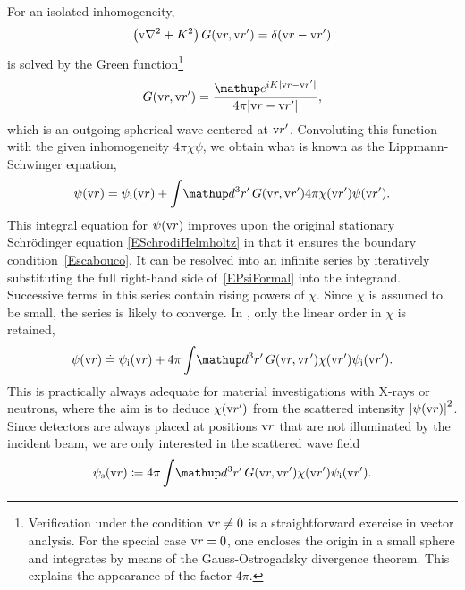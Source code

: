 For an isolated inhomogeneity,
\begin{equation}\label{EHelmholtzForGreen}
  \left(\text{v}{\nabla}^2+K^2\right)G(\text{v}{r},\text{v}{r}') = \delta(\text{v}{r}-\text{v}{r}')
\end{equation}
%
%
is solved by the Green function\footnote
{Verification under the condition $\text{v}{r}\ne0$
is a straightforward exercise in vector analysis.
For the special case $\text{v}{r}=0$,
one encloses the origin in a small sphere
and integrates by means of the Gauss-Ostrogadsky divergence theorem.
This explains the appearance of the factor $4\pi$.}
\begin{equation}\label{EGreens1}
  G(\r,\r') = \frac{\e^{iK|\r-\r'|}}{4\pi |\r-\r'|},
\end{equation}
which is an outgoing spherical wave centered at $\text{v}{r}'$.
Convoluting this function with the given inhomogeneity $4\pi\chi\psi$,
we obtain what is known as the Lippmann-Schwinger equation,
\begin{equation}\label{EPsiFormal}
  \psi(\r)
  = \psi_\ti(\r)
  + \int\!\d^3r'\, G(\r,\r') 4\pi\chi(\r')\psi(\r').
\end{equation}
This integral equation for $\psi(\text{v}{r})$ improves
upon the original stationary Schrödinger equation \cref{ESchrodiHelmholtz}
in that it ensures the boundary condition~\cref{Escabouco}.
It can be resolved into an infinite series
by iteratively substituting the full right-hand side of~\cref{EPsiFormal}
into the integrand.
Successive terms in this series contain rising powers of $\chi$.
Since $\chi$ is assumed to be small, the series is likely to converge.
In ,
only the linear order in $\chi$ is retained,
\begin{equation}\label{EBorn}
  \psi(\r)
  \doteq \psi_\ti(\r)
  + 4\pi \int\!\d^3r'\, G(\r,\r') \chi(\r') \psi_\ti(\r').
\end{equation}
This is practically always adequate for
material investigations with X-rays or neutrons,
where the aim is to
deduce $\chi(\text{v}{r}')$ from the scattered intensity ${|\psi(\text{v}{r})|}^2$.
Since detectors are always placed at positions $\text{v}{r}$
that are not illuminated by the incident beam,
we are only interested in the scattered wave field
\begin{equation}\label{EBornS}
  \psi_\text{s}(\r)
  \coloneqq
  4\pi \int\!\d^3r'\, G(\r,\r') \chi(\r') \psi_\ti(\r').
\end{equation}
%
%


